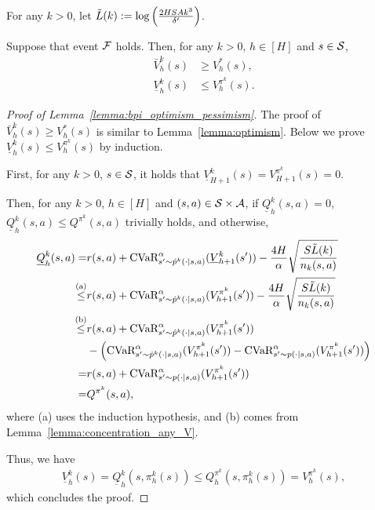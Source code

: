 For any $k>0$, let $\tilde{L}(k):=\log \left( \frac{2HSA k^3}{\delta'} \right)$.

\begin{lemma} \label{lemma:bpi_optimism_pessimism}
	Suppose that event $\mathcal{F}$ holds. Then, for any $k>0$, $h \in [H]$ and $s \in \mathcal{S}$, 
	\begin{align*}
		\bar{V}^k_h(s) & \geq V^{*}_h(s) ,
		\\
		\underline{V}^k_h(s) & \leq V^{\pi^k}_h(s) .
	\end{align*}
\end{lemma}

\begin{proof}[Proof of Lemma~\ref{lemma:bpi_optimism_pessimism}]
	The proof of $\bar{V}^k_h(s) \geq V^{*}_h(s)$ is similar to Lemma~\ref{lemma:optimism}.
	Below we prove $\underline{V}^k_h(s) \leq V^{\pi^k}_h(s)$ by induction.
	
	First, for any $k>0$, $s \in \mathcal{S}$, it holds that $\underline{V}^k_{H+1}(s) = V^{\pi^k}_{H+1}(s)=0$.
	
	Then, for any $k>0$, $h \in [H]$ and $(s,a) \in \mathcal{S} \times \mathcal{A}$, if $\underline{Q}^k_h(s,a)=0$, $\underline{Q}^k_h(s,a) \leq Q^{\pi^k}(s,a)$ trivially holds, and otherwise,
	\begin{align*}
		\underline{Q}^k_h(s,a) = & r(s,a)+\textup{CVaR}^{\alpha}_{s' \sim \hat{p}^k(\cdot|s,a)}(\underline{V}^k_{h+1}(s')) - \frac{4H}{\alpha}\sqrt{\frac{S\tilde{L}(k)}{n_k(s,a)}}
		\\
		\overset{\textup{(a)}}{\leq} & r(s,a)+\textup{CVaR}^{\alpha}_{s' \sim \hat{p}^k(\cdot|s,a)}(V^{\pi^k}_{h+1}(s')) - \frac{4H}{\alpha}\sqrt{\frac{S\tilde{L}(k)}{n_k(s,a)}}
		\\
		\overset{\textup{(b)}}{\leq} & r(s,a)+\textup{CVaR}^{\alpha}_{s' \sim \hat{p}^k(\cdot|s,a)}(V^{\pi^k}_{h+1}(s')) \\& - \left(  \textup{CVaR}^{\alpha}_{s' \sim \hat{p}^k(\cdot|s,a)}(V^{\pi^k}_{h+1}(s')) - \textup{CVaR}^{\alpha}_{s' \sim p(\cdot|s,a)}(V^{\pi^k}_{h+1}(s'))  \right)
		\\
		= & r(s,a)+\textup{CVaR}^{\alpha}_{s' \sim p(\cdot|s,a)}(V^{\pi^k}_{h+1}(s')) 
		\\
		= & Q^{\pi^k}(s,a) ,
	\end{align*}
	where (a) uses the induction hypothesis, and (b) comes from Lemma~\ref{lemma:concentration_any_V}.
	
	Thus, we have
	\begin{align*}
		\underline{V}^k_h(s) = \underline{Q}^k_h(s,\pi^k_h(s)) \leq Q^{\pi^k}_h(s,\pi^k_h(s)) = V^{\pi^k}_h(s) ,
	\end{align*}
	which concludes the proof.
\end{proof}


